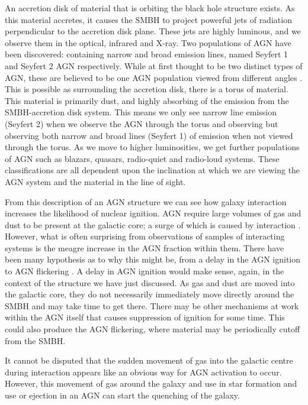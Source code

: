 An accretion disk of material that is orbiting the black hole structure exists. As this material accretes, it causes the SMBH to project powerful jets of radiation perpendicular to the accretion disk plane. These jets are highly luminous, and we observe them in the optical, infrared and X-ray. Two populations of AGN have been discovered: containing narrow and broad emission lines, named Seyfert 1 and Seyfert 2 AGN respectively. While at first thought to be two distinct types of AGN, these are believed to be one AGN population viewed from different angles \citep[for a review of the unification, see][]{2015ARA&A..53..365N}. This is possible as surrounding the accretion disk, there is a torus of material. This material is primarily dust, and highly absorbing of the emission from the SMBH-accretion disk system. This means we only see narrow line emission (Seyfert 2) when we observe the AGN through the torus and observing but observing both narrow and broad lines (Seyfert 1) of emission when not viewed through the torus. As we move to higher luminosities, we get further populations of AGN such as blazars, quasars, radio-quiet and radio-loud systems. These classifications are all dependent upon the inclination at which we are viewing the AGN system and the material in the line of sight.

From this description of an AGN structure we can see how galaxy interaction increases the likelihood of nuclear ignition. AGN require large volumes of gas and dust to be present at the galactic core; a surge of which is caused by interaction \citep[][provides an excellent summary of this process from the point of view of simulations]{2008ApJS..175..356H}. However, what is often surprising from observations of samples of interacting systems is the meagre increase in the AGN fraction within them. There have been many hypothesis as to why this might be, from a delay in the AGN ignition \citep{2011MNRAS.418.2043E} to AGN flickering \citep{2015MNRAS.451.2517S}. A delay in AGN ignition would make sense, again, in the context of the structure we have just discussed. As gas and dust are moved into the galactic core, they do not necessarily immediately move directly around the SMBH and may take time to get there. There may be other mechanisms at work within the AGN itself that causes suppression of ignition for some time. This could also produce the AGN flickering, where material may be periodically cutoff from the SMBH.

It cannot be disputed that the sudden movement of gas into the galactic centre during interaction appears like an obvious way for AGN activation to occur. However, this movement of gas around the galaxy and use in star formation and use or ejection in an AGN can start the quenching of the galaxy. 

